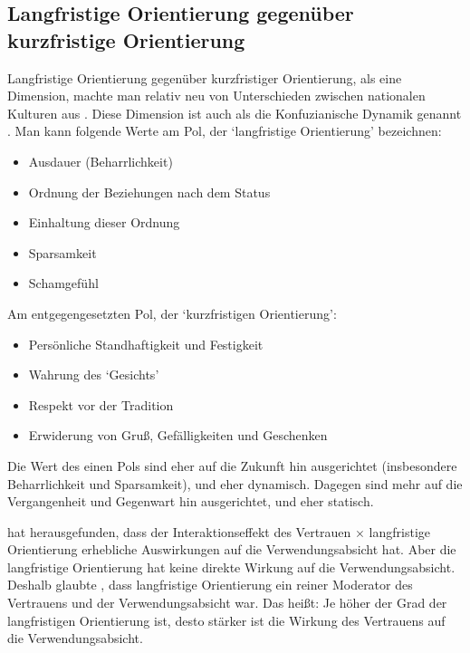 \subsection{Langfristige Orientierung gegenüber kurzfristige Orientierung} \label{dimension:langfristig}
Langfristige Orientierung gegenüber kurzfristiger Orientierung, als eine Dimension, machte man relativ neu von Unterschieden zwischen nationalen Kulturen aus \citep[p. ~29]{hofstede2013interkulturelle}. Diese Dimension ist auch als die Konfuzianische Dynamik genannt \citep{hofstede2013interkulturelle, Schumann2010a, Lam2009}. Man kann folgende Werte am Pol, der `langfristige Orientierung' bezeichnen: \citep[p. ~190]{hofstede2013interkulturelle}
\begin{itemize}
  \item Ausdauer (Beharrlichkeit)
  \item Ordnung der Beziehungen nach dem Status
  \item Einhaltung dieser Ordnung
  \item Sparsamkeit
  \item Schamgefühl
\end{itemize}

Am entgegengesetzten Pol, der `kurzfristigen Orientierung':
\begin{itemize}
  \item Persönliche Standhaftigkeit und Festigkeit
  \item Wahrung des `Gesichts'
  \item Respekt vor der Tradition
  \item Erwiderung von Gruß, Gefälligkeiten und Geschenken
\end{itemize}

Die Wert des einen Pols sind eher auf die Zukunft hin ausgerichtet (insbesondere Beharrlichkeit und Sparsamkeit), und eher dynamisch. Dagegen sind mehr auf die Vergangenheit und Gegenwart hin ausgerichtet, und eher statisch. \citep[p. ~190]{hofstede2013interkulturelle}

\citet{Yoon2009} hat herausgefunden, dass der Interaktionseffekt des Vertrauen $\times$ langfristige Orientierung erhebliche Auswirkungen auf die Verwendungsabsicht hat. Aber die langfristige Orientierung hat keine direkte Wirkung auf die Verwendungsabsicht. Deshalb glaubte \citeauthor{Yoon2009}, dass langfristige Orientierung ein reiner Moderator des Vertrauens und der Verwendungsabsicht war. Das heißt: Je höher der Grad der langfristigen Orientierung ist, desto stärker ist die Wirkung des Vertrauens auf die Verwendungsabsicht. \citep{Yoon2009}

